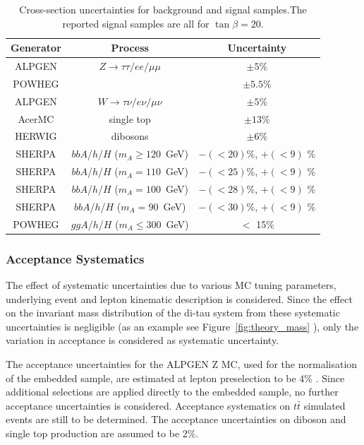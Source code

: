 \begin{table} [t]
\centering
\begin{tabular}{c c c }
\hline
\hline
Generator & Process & Uncertainty \\ [0.5ex]
\hline
ALPGEN & $Z \rightarrow \tau\tau / ee /\mu\mu$ & $\pm 5\%$ \\
POWHEG & \ttbar					& $\pm 5.5\%$\\
ALPGEN & $W  \rightarrow \tau\nu / e\nu /\mu\nu$&  $\pm  5\%$ \\
AcerMC & single top & $\pm 13 \%$ \\
HERWIG & dibosons & $\pm 6 \%$ \\
SHERPA & $bbA$/$h$/$H$  ($m_{A} \ge 120$~GeV)     & $-(<20)$\%,  $+(<9)$ \%\\
SHERPA & $bbA$/$h$/$H$  ($m_{A} =   110$~GeV)     & $-(<25)$\%,  $+(<9)$ \%\\
SHERPA & $bbA$/$h$/$H$  ($m_{A} =   100$~GeV)     & $-(<28)$\%,  $+(<9)$ \%\\
SHERPA & $bbA$/$h$/$H$  ($m_{A} =    90$~GeV)     & $-(<30)$\%,  $+(<9)$ \%\\
POWHEG & $ggA$/$h$/$H$  ($m_{A} \le 300$~GeV)     & $<$ 15\%\\  [0.5ex]
\hline \hline 
\end{tabular}
\caption{Cross-section uncertainties for background and signal samples.The reported signal samples are all for $\tan\beta = 20$.}
\label{table:sys_xsec}
\end{table}

\subsubsection{Acceptance Systematics}

The effect of systematic uncertainties due to various MC tuning
parameters, underlying event and
lepton kinematic description is considered.
Since the effect on the invariant mass distribution of the di-tau system from these systematic
uncertainties is negligible (as an example see
Figure~\ref{fig:theory_mass} ), only the variation in
acceptance is considered as systematic uncertainty.

The acceptance uncertainties for the ALPGEN Z MC, used for the normalisation of the embedded sample, 
are estimated at lepton preselection to be 4\% \cite{2010SMLLSupportNote}.
Since additional selections are applied directly to the embedded sample, 
no further acceptance uncertainties is considered. Acceptance systematics on
$t\bar{t}$ simulated events are still to be determined. %
The acceptance uncertainties on diboson and single top production are assumed to be 2\%.

